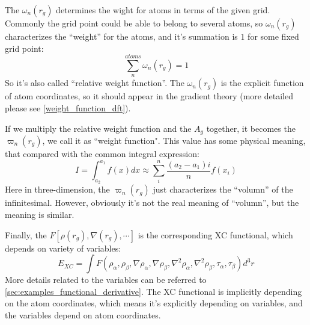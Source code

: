 The $\omega_{n}(r_{g})$ determines the wight for atoms in terms of the given
grid. Commonly the grid point could be able to belong to several
atoms, so $\omega_{n}(r_{g})$ characterizes the ``weight'' for the atoms, and
it's summation is $1$ for some fixed grid point:
\begin{equation}
 \sum_{n}^{atoms}\omega_{n}(r_{g}) = 1
\end{equation}
So it's also called ``relative weight function''. The $\omega_{n}(r_{g})$ is the
explicit function of atom coordinates, so it should appear in the gradient
theory (more detailed please see \ref{weight_function_dft}).

If we multiply the relative weight function and the $A_{g}$ together, it
becomes the $\varpi_{n}(r_{g})$, we call it as ``weight function". This value
has some physical meaning, that
compared with the common integral expression:
\begin{equation}
 I = \int^{a_{1}}_{a_{2}} f(x) dx \approx \sum_{i}^{n}\frac{(a_{2} -
a_{1})i}{n}f(x_{i})
\end{equation}
Here in three-dimension, the $\varpi_{n}(r_{g})$ just characterizes the
``volumn'' of the infinitesimal. However, obviously it's not the real meaning
of ``volumn'', but the meaning is similar. 

Finally, the $F[\rho(r_{g}), \nabla(r_{g}), \cdots]$ is the
corresponding XC functional, which depends on variety of variables:
\begin{equation}
 \label{NUM_AO_INT_gradient_eq:2} 
 E_{XC} = \int  F(\rho_{\alpha}, \rho_{\beta}, \nabla\rho_{\alpha},
\nabla\rho_{\beta}, \nabla^{2}\rho_{\alpha},
\nabla^{2}\rho_{\beta}, \tau_{\alpha}, \tau_{\beta})d^{3}r
\end{equation}
More details related to the variables can be referred to 
\ref{sec:examples_functional_derivative}. The XC functional is implicitly
depending on the atom coordinates, which means it's explicitly depending on
variables, and the variables depend on atom coordinates. 

